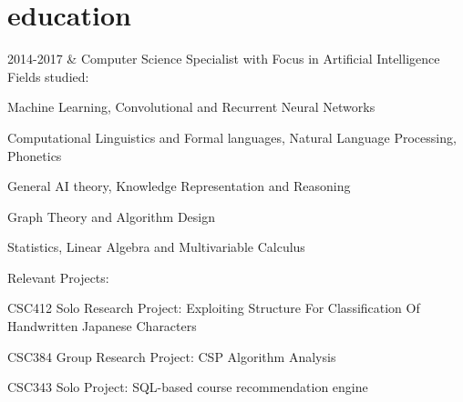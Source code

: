 \documentclass[]{cv-roald}
\begin{document}
\section*{education}
\begin{tabularcv}
    2014-2017   &   
                    \newline Computer Science Specialist with Focus in Artificial Intelligence
                    \newline Fields studied:
                    \begin{tabitemize}
                        \item Machine Learning, Convolutional and Recurrent Neural Networks
                        \item Computational Linguistics and Formal languages, Natural Language Processing, Phonetics
                        \item General AI theory, Knowledge Representation and Reasoning
                        \item Graph Theory and Algorithm Design
                        \item Statistics, Linear Algebra and Multivariable Calculus\newline
                    \end{tabitemize}
                    Relevant Projects:
                    \begin{tabitemize}
                        \item CSC412 Solo Research Project: Exploiting Structure For Classification Of Handwritten Japanese Characters
                        \item CSC384 Group Research Project: CSP Algorithm Analysis
                        \item CSC343 Solo Project: SQL-based course recommendation engine
                    \end{tabitemize}
                    \\[\vspacepar] %


\end{tabularcv}
\end{document}
